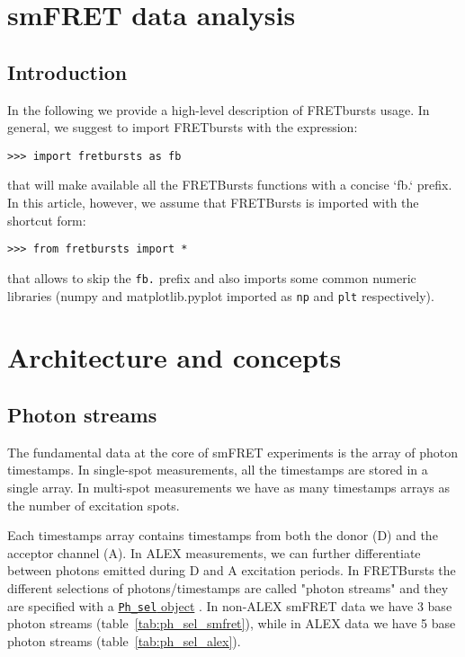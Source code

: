 \section{smFRET data analysis}

\subsection{Introduction}

In the following we provide a high-level description of FRETbursts usage. In general, we suggest to import FRETbursts with the expression:

\begin{verbatim}
>>> import fretbursts as fb
\end{verbatim}

that will make available all the FRETBursts functions with a concise `fb.` prefix. In this article, however, we assume that FRETBursts is imported with the shortcut form:

\begin{verbatim}
>>> from fretbursts import *
\end{verbatim}

that allows to skip the \verb|fb.| prefix and also imports some common numeric libraries (numpy and matplotlib.pyplot imported as \verb|np| and \verb|plt| respectively).

\section{Architecture and concepts}
\subsection{Photon streams}
\label{sec:ph_streams}

The fundamental data at the core of smFRET experiments is the array of photon timestamps. In single-spot measurements, all the timestamps are stored in a single array. In multi-spot measurements we have as many timestamps arrays as the number of excitation spots.

Each timestamps array contains timestamps from both the donor (D) and the acceptor channel (A). In ALEX measurements, we can further differentiate between photons emitted during D and A excitation periods. In FRETBursts the different selections of photons/timestamps are called "photon streams" and they are specified with a \href{http://fretbursts.readthedocs.org/en/latest/data_class.html#module-fretbursts.ph_sel}{\texttt{Ph\_sel} object} . In non-ALEX smFRET data we have 3 base photon streams (table~\ref{tab:ph_sel_smfret}), while in ALEX data we have 5 base photon streams 
(table~\ref{tab:ph_sel_alex}).

